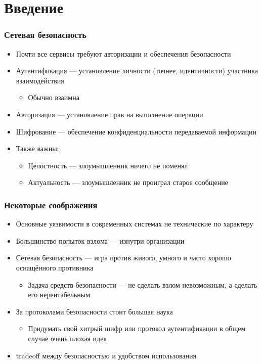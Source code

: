 \documentclass{../cscslides}
\begin{document}
    \frame{\titlepage}

    \section{Введение}

    \begin{frame}
        \frametitle{Сетевая безопасность}
        \begin{itemize}
            \item Почти все сервисы требуют авторизации и обеспечения безопасности
            \item Аутентификация --- установление личности (точнее, идентичности) участника взаимодействия
            \begin{itemize}
                \item Обычно взаимна
            \end{itemize}
            \item Авторизация --- установление прав на выполнение операции
            \item Шифрование --- обеспечение конфиденциальности передаваемой информации
            \item Также важны:
            \begin{itemize}
                \item Целостность --- злоумышленник ничего не поменял
                \item Актуальность --- злоумышленник не проиграл старое сообщение
            \end{itemize} 
        \end{itemize}
    \end{frame}

    \begin{frame}
        \frametitle{Некоторые соображения}
        \begin{itemize}
            \item Основные уязвимости в современных системах не технические по характеру
            \item Большинство попыток взлома --- изнутри организации
            \item Сетевая безопасность --- игра против живого, умного и часто хорошо оснащённого противника
            \begin{itemize}
                \item Задача средств безопасности --- не сделать взлом невозможным, а сделать его нерентабельным
            \end{itemize}
            \item За протоколами безопасности стоит большая наука
            \begin{itemize}
                \item Придумать свой хитрый шифр или протокол аутентификации в общем случае очень плохая идея
            \end{itemize} 
            \item tradeoff между безопасностью и удобством использования
        \end{itemize}
    \end{frame}
\end{document}
